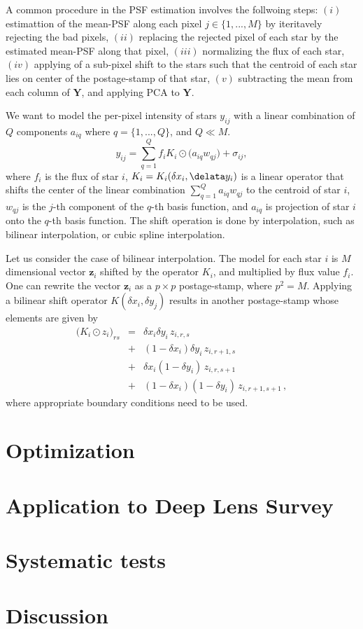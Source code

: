 \documentclass[12pt, preprint]{aastex}
\newcommand{\beq}{\begin{equation}}
\newcommand{\eeq}{\end{equation}}
\begin{document}
A common procedure in the PSF estimation involves the follwoing steps: $(i)$
estimattion of the mean-PSF along each pixel $j\in\{1,...,M\}$
by iteritavely rejecting the bad pixels, $(ii)$ replacing the rejected pixel of
each star by the estimated mean-PSF along that pixel, $(iii)$ 
normalizing the flux of each star, $(iv)$ applying of a sub-pixel shift
to the stars such that the centroid of each star lies on center 
of the postage-stamp of that star, $(v)$ subtracting the mean from each column
of $\mathbf{Y}$, and applying PCA to $\mathbf{Y}$.

We want to model the per-pixel intensity of stars $y_{ij}$ with a linear
combination of $Q$ components $a_{iq}$ where $q=\{1,...,Q\}$, and $Q\ll M$.
\beq
y_{ij} = \sum_{q=1}^{Q} f_{i}K_{i}\odot\big(a_{iq}w_{qj}\big) + \sigma_{ij},
\eeq
where $f_{i}$ is the flux of star $i$, $K_{i} = K_{i}(\delta x_{i} , \delata y_{i})$
is a linear operator that shifts the center of the linear combination
$\sum_{q=1}^{Q}a_{iq}w_{qj}$ to the centroid of star $i$, $w_{qj}$ is the 
$j$-th component of the $q$-th basis function, and $a_{iq}$ is projection
of star $i$ onto the $q$-th basis function. The shift
operation is done by interpolation, such as bilinear interpolation,
or cubic spline interpolation. 

Let us consider the case of bilinear interpolation. The model for each star
$i$ is $M$ dimensional vector $\mathbf{z}_{i}$ shifted by the operator $K_{i}$,
and multiplied by flux value $f_{i}$. One can rewrite the vector $\mathbf{z}_{i}$
as a $p\times p$ postage-stamp, where $p^{2}=M$.
Applying a bilinear shift operator $K(\delta x_{i} , \delta y_{j})$
results in another postage-stamp whose elements are given by
\begin{eqnarray}
\big(K_{i}\odot z_{i}\big)_{rs} &=& \delta x_{i} \delta y_{i} \, z_{i,r,s} \nonumber \\
                                &+& (1 - \delta x_{i}) \delta y_{i} \, z_{i,r+1,s} \nonumber \\ 
                                &+& \delta x_{i} (1-\delta y_{i}) \, z_{i,r,s+1} \nonumber \\ 
                                &+& (1 - \delta x_{i})(1-\delta y_{i}) \, z_{i,r+1,s+1} \, ,
\end{eqnarray}
where appropriate boundary conditions need to be used. 

\section{Optimization}\label{sec:opt}


\section{Application to Deep Lens Survey}\label{sec:data}
\section{Systematic tests}\label{sec:sys}
\section{Discussion}\label{sec:discussion} 
\end{document}
